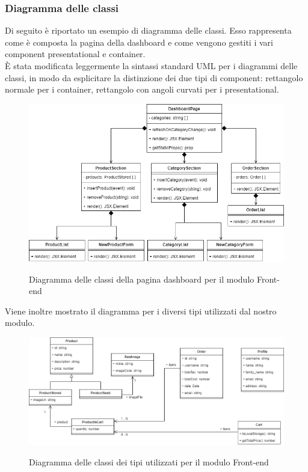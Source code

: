 \subsubsection{Diagramma delle classi}
Di seguito è riportato un esempio di diagramma delle classi. Esso rappresenta come è composta la pagina della dashboard e come vengono gestiti i vari component presentational e container.\\ È stata  modificata leggermente la sintassi standard UML per i diagrammi delle classi, in modo da esplicitare la distinzione dei due tipi di component: rettangolo normale per i container, rettangolo con angoli curvati per i presentational.

\vspace{1cm}

\begin{figure}[H]
\centering
\includegraphics[scale=0.55]{res/Architettura/Frontend/img/class_frontend_dashboard}\\
\caption{Diagramma delle classi della pagina dashboard per il modulo Front-end}
\end{figure}

Viene inoltre mostrato il diagramma per i diversi tipi utilizzati dal nostro modulo.

\begin{figure}[H]
\centering
\includegraphics[scale=0.45]{res/Architettura/Frontend/img/class_frontend_types}\\
\caption{Diagramma delle classi dei tipi utilizzati per il modulo Front-end}
\end{figure}